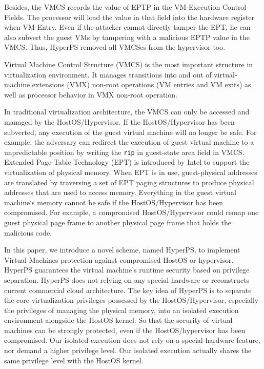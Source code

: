 Besides, the VMCS records the value of EPTP in the VM-Execution Control Fields. The processor will load the value in that field into the hardware register when VM-Entry. 
Even if the attacker cannot directly tamper the EPT, he can also subvert the guest VMs by tampering with a malicious EPTP value in the VMCS. Thus, HyperPS removed all VMCSes from the hypervisor too. 

Virtual Machine Control Structure (VMCS) is the most important structure in virtualization environment. It manages transitions into and out of virtual-machine extensions (VMX) non-root operations (VM entries and VM exits) as well as processor behavior in VMX non-root operation. 

In traditional virtualization architecture, the VMCS can only be accessed and managed by the HostOS/Hypervisor.
If the HostOS/Hypervisor has been subverted, any execution of the guest virtual machine will no longer be safe. For example, the adversary can redirect the execution of guest virtual machine to a unpredictable position by writing the \verb|rip| in guest-state area field in VMCS.
Extended Page-Table Technology (EPT) is introduced by Intel to support the virtualization of physical memory.
When EPT is in use, guest-physical addresses are translated by traversing a set of EPT paging structures to produce physical addresses that are used to access memory. Everything in the guest virtual machine`s memory cannot be safe if the HostOS/Hypervisor has been compromised. For example, a compromised HostOS/Hypervisor could remap one guest physical page frame to another physical page frame that holds the malicious code.
\fi

In this paper, we introduce a novel scheme, named HyperPS, to implement Virtual Machines protection against compromised HostOS or hypervisor.
HyperPS guarantees the virtual machine's runtime security 
based on privilege separation. 
HyperPS does not relying on any special hardware or reconstructs current commercial cloud architecture. The key idea of HyperPS is to separate the core virtualization privileges possessed by the HostOS/Hypervisor, especially the privileges of managing the physical memory, into an isolated execution environment alongside the HostOS kernel. 
So that the security of virtual machines can be strongly protected, even if the HostOS/hypervisor has been compromised. Our isolated execution does not rely on a special hardware feature, nor demand a higher privilege level. Our isolated execution actually shares the same privilege level with the HostOS kernel. 


